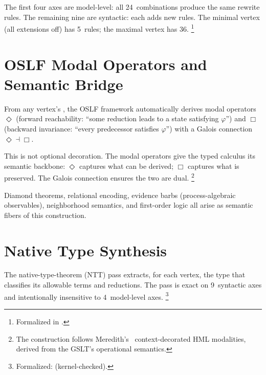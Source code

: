 \documentclass[11pt,openany]{report}
\begin{document}
\noindent
The first four axes are model-level: all 24~combinations produce the
same rewrite rules.  The remaining nine are syntactic: each adds new
rules.  The minimal vertex (all extensions off) has 5~rules; the
maximal vertex has 36.%
\footnote{Formalized in
.}



\section{OSLF Modal Operators and Semantic Bridge}

From any vertex's , the OSLF framework automatically
derives modal operators $\Diamond$ (forward reachability: ``some
reduction leads to a state satisfying $\varphi$'') and $\Box$
(backward invariance: ``every predecessor satisfies $\varphi$'') with
a Galois connection $\Diamond \dashv \Box$.

This is not optional decoration.  The modal operators give the typed
calculus its semantic backbone: $\Diamond$ captures what can be
derived; $\Box$ captures what is preserved.  The Galois connection
ensures the two are dual.%
\footnote{The construction follows
Meredith's~\cite{meredith2026ccc} context-decorated HML modalities,
derived from the GSLT's operational semantics.}

Diamond theorems, relational encoding, evidence barbs
(process-algebraic observables), neighborhood semantics, and
first-order logic all arise as semantic fibers of this construction.


\section{Native Type Synthesis}

The native-type-theorem (NTT) pass extracts, for each vertex, the
type that classifies its allowable terms and reductions.  The pass is
exact on 9~syntactic axes and intentionally insensitive to
4~model-level axes.%
\footnote{Formalized:  (kernel-checked).}
\end{document}
